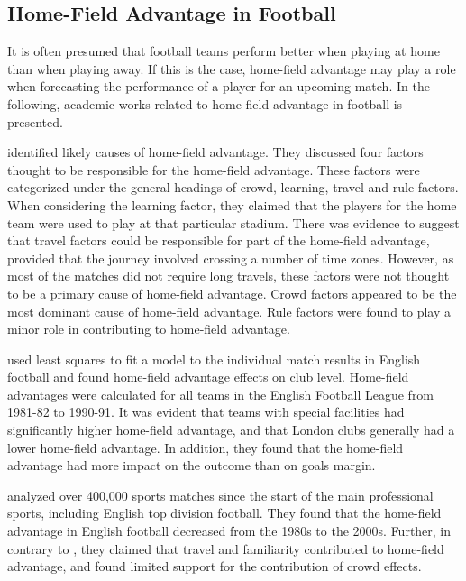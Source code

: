 \subsection{Home-Field Advantage in Football}\label{HomeFieldAdvantage}

It is often presumed that football teams perform better when playing at home than when playing away. If this is the case, home-field advantage may play a role when forecasting the performance of a player for an upcoming match. In the following, academic works related to home-field advantage in football is presented.

\newpar

\cite{Nevill} identified likely causes of home-field advantage. They discussed four factors thought to be responsible for the home-field advantage. These factors were categorized under the general headings of crowd, learning, travel and rule factors. When considering the learning factor, they claimed that the players for the home team were used to play at that particular stadium. There was evidence to suggest that travel factors could be responsible for part of the home-field advantage, provided that the journey involved crossing a number of time zones. However, as most of the matches did not require long travels, these factors were not thought to be a primary cause of home-field advantage. Crowd factors appeared to be the most dominant cause of home-field advantage. Rule factors were found to play a minor role in contributing to home-field advantage.

\newpar

\cite{Clarke} used least squares to fit a model to the individual match results in English football and found home-field advantage effects on club level. Home-field advantages were calculated for all teams in the English Football League from 1981-82 to 1990-91. It was evident that teams with special facilities had significantly higher home-field advantage, and that London clubs generally had a lower home-field advantage. In addition, they found that the home-field advantage had more impact on the outcome than on goals margin.

\newpar

\cite{Pollard} analyzed over 400,000 sports matches since the start of the main professional sports, including English top division football. They found that the home-field advantage in English football decreased from the 1980s to the 2000s. Further, in contrary to \cite{Nevill}, they claimed that travel and familiarity contributed to home-field advantage, and found limited support for the contribution of crowd effects.

